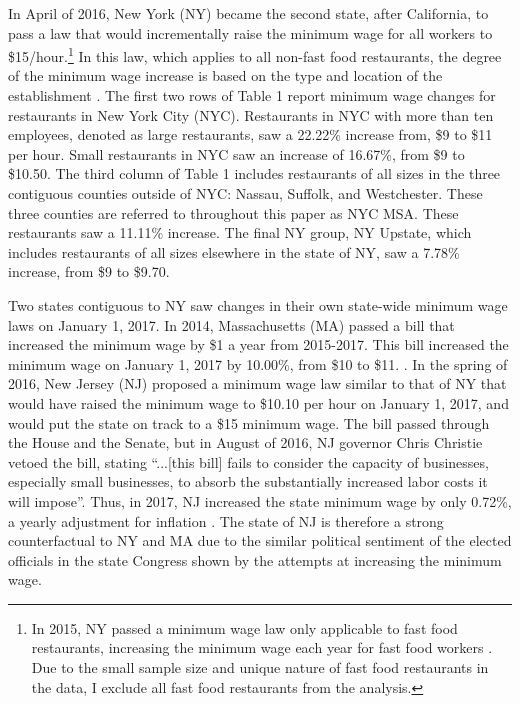 \documentclass[11pt]{article}
\begin{document}
In April of 2016, New York (NY) became the second state, after California, to pass a law that would incrementally raise the minimum wage for all workers to \$15/hour.\footnote{In 2015, NY passed a minimum wage law only applicable to fast food restaurants, increasing the minimum wage each year for fast food workers \cite{nyff}. Due to the small sample size and unique nature of fast food restaurants in the data, I exclude all fast food restaurants from the analysis.} In this law, which applies to all non-fast food restaurants, the degree of the minimum wage increase is based on the type and location of the establishment \cite{nybill}. The first two rows of Table 1 report minimum wage changes for restaurants in New York City (NYC). Restaurants in NYC with more than ten employees, denoted as large restaurants, saw a 22.22\% increase from, \$9 to \$11 per hour. Small restaurants in NYC saw an increase of 16.67\%, from \$9 to \$10.50. The third column of Table 1 includes restaurants of all sizes in the three contiguous counties outside of NYC: Nassau, Suffolk, and Westchester. These three counties are referred to throughout this paper as NYC MSA. These restaurants saw a 11.11\% increase. The final NY group, NY Upstate, which includes restaurants of all sizes elsewhere in the state of NY, saw a 7.78\% increase, from \$9 to \$9.70.

Two states contiguous to NY saw changes in their own state-wide minimum wage laws on January 1, 2017. In 2014, Massachusetts (MA) passed a bill that increased the minimum wage by \$1 a year from 2015-2017. This bill increased the minimum wage on January 1, 2017 by 10.00\%, from \$10 to \$11. \cite{mabill}. In the spring of 2016, New Jersey (NJ) proposed a minimum wage law similar to that of NY that would have raised the minimum wage to \$10.10 per hour on January 1, 2017, and would put the state on track to a \$15 minimum wage. The bill passed through the House and the Senate, but in August of 2016, NJ governor Chris Christie vetoed the bill, stating ``...[this bill] fails to consider the capacity of businesses, especially small businesses, to absorb the substantially increased labor costs it will impose''\cite{njveto}. Thus, in 2017, NJ increased the state minimum wage by only 0.72\%, a yearly adjustment for inflation \cite{njbill}. %
The state of NJ is therefore a strong counterfactual to NY and MA due to the similar political sentiment of the elected officials in the state Congress shown by the attempts at increasing the minimum wage. 
\end{document}
